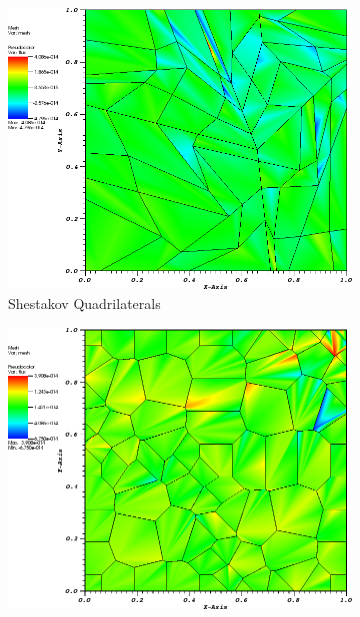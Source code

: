 \begin{figure}
{\begin{subfigure}[b]{0.465\textwidth}
	\end{subfigure}
}
{
	\vspace{3mm}
	\begin{subfigure}[b]{0.465\textwidth}
		\centering
		\label{subfig::shes_quad_me_k2_lin_sol}
		\includegraphics[width=\textwidth]{figures/sec_BF/quad_err_shesquad_MV2.png}
		\caption{Shestakov Quadrilaterals}
	\end{subfigure}
	\hfill
	\begin{subfigure}[b]{0.465\textwidth}
		\centering
		\label{subfig::smooth_poly_me_k2_lin_sol}
		\includegraphics[width=\textwidth]{figures/sec_BF/quad_err_sinepoly_MV2.png}

\end{subfigure}}
\end{figure}
